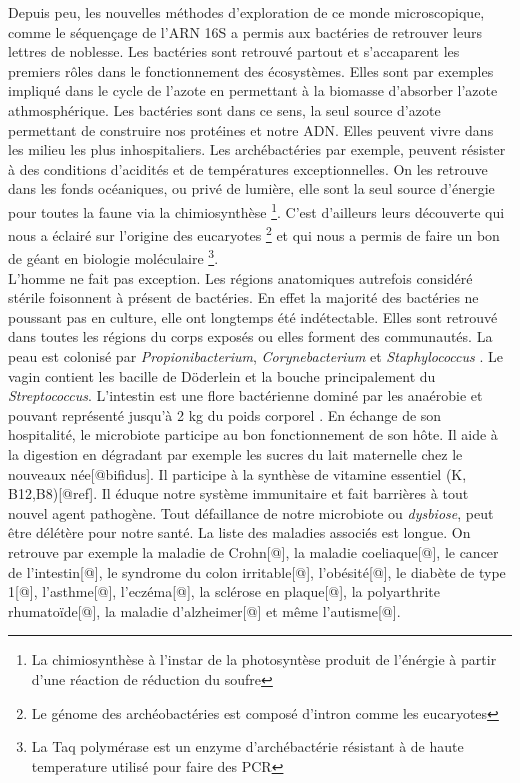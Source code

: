 \documentclass[12pt,a4paper]{article}
\begin{document}
Depuis peu, les nouvelles méthodes d'exploration de ce monde microscopique, comme le séquençage de l’ARN 16S a permis aux bactéries de retrouver leurs lettres de noblesse.
Les bactéries sont retrouvé partout et s'accaparent les premiers rôles dans le fonctionnement des écosystèmes. Elles sont par exemples impliqué dans le cycle de l'azote en permettant à la biomasse d'absorber l'azote athmosphérique. Les bactéries sont dans ce sens, la seul source d'azote permettant de construire nos protéines et notre ADN.
Elles peuvent vivre dans les milieu les plus inhospitaliers. Les archébactéries par exemple, peuvent résister à des conditions d'acidités et de températures exceptionnelles. On les retrouve dans les fonds océaniques, ou privé de lumière, elle sont la seul source d'énergie pour toutes la faune via la chimiosynthèse \footnote{La chimiosynthèse à l'instar de la photosyntèse produit de l'énérgie à partir d'une réaction de réduction du soufre}. C’est d’ailleurs leurs découverte qui nous a éclairé sur l’origine des eucaryotes \footnote{Le génome des archéobactéries est composé d'intron comme les eucaryotes} et qui nous a permis de faire un bon de géant en biologie moléculaire \footnote{La Taq polymérase est un enzyme d'archébactérie résistant à de haute temperature utilisé pour faire des PCR}.\\
L'homme ne fait pas exception. Les régions anatomiques autrefois considéré stérile foisonnent à présent de bactéries. En effet la majorité des bactéries ne poussant pas en culture, elle ont longtemps été indétectable. 
Elles sont retrouvé dans toutes les régions du corps exposés ou elles forment des communautés.
La peau est colonisé par \textit{Propionibacterium}, \textit{Corynebacterium} et \textit{Staphylococcus} \citep{Beck}. Le vagin contient les bacille de Döderlein et la bouche principalement du \textit{Streptococcus}\cite{Beck}.
L'intestin est une flore bactérienne dominé par les anaérobie et pouvant représenté jusqu'à 2 kg du poids corporel \citep{Beck}.
En échange de son hospitalité, le microbiote participe au bon fonctionnement de son hôte. Il aide à la digestion en dégradant par exemple les sucres du lait maternelle chez le nouveaux née[@bifidus]. Il participe à la synthèse de vitamine essentiel (K, B12,B8)[@ref]. Il éduque notre système immunitaire et fait barrières à tout nouvel agent pathogène.
Tout défaillance de notre microbiote ou \textit{dysbiose}, peut être délétère pour notre santé. La liste des maladies associés est longue. On retrouve par exemple la maladie de Crohn[@], la maladie coeliaque[@], le cancer de l’intestin[@], le syndrome du colon irritable[@], l’obésité[@], le diabète de type 1[@], l’asthme[@], l’eczéma[@], la sclérose en plaque[@], la polyarthrite rhumatoïde[@], la maladie d’alzheimer[@] et même l’autisme[@]. \\
\end{document}
